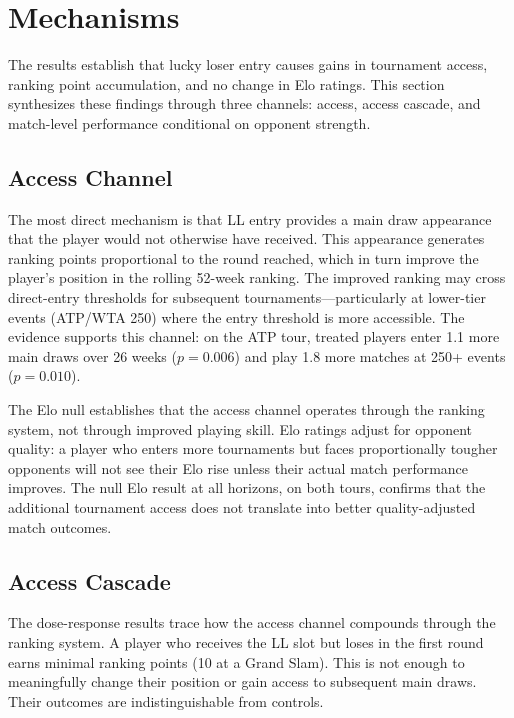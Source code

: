 \section{Mechanisms}
\label{sec:mechanisms}

The results establish that lucky loser entry causes gains in tournament access, ranking point accumulation, and no change in Elo ratings. This section synthesizes these findings through three channels: access, access cascade, and match-level performance conditional on opponent strength.

\subsection{Access Channel}
\label{sec:mechanisms_access}

The most direct mechanism is that LL entry provides a main draw appearance that the player would not otherwise have received. This appearance generates ranking points proportional to the round reached, which in turn improve the player's position in the rolling 52-week ranking. The improved ranking may cross direct-entry thresholds for subsequent tournaments---particularly at lower-tier events (ATP/WTA 250) where the entry threshold is more accessible. The evidence supports this channel: on the ATP tour, treated players enter 1.1 more main draws over 26 weeks ($p = 0.006$) and play 1.8 more matches at 250+ events ($p = 0.010$).

The Elo null establishes that the access channel operates through the ranking system, not through improved playing skill. Elo ratings adjust for opponent quality: a player who enters more tournaments but faces proportionally tougher opponents will not see their Elo rise unless their actual match performance improves. The null Elo result at all horizons, on both tours, confirms that the additional tournament access does not translate into better quality-adjusted match outcomes.

\subsection{Access Cascade}
\label{sec:mechanisms_cascade}

The dose-response results trace how the access channel compounds through the ranking system. A player who receives the LL slot but loses in the first round earns minimal ranking points (10 at a Grand Slam). This is not enough to meaningfully change their position or gain access to subsequent main draws. Their outcomes are indistinguishable from controls.

